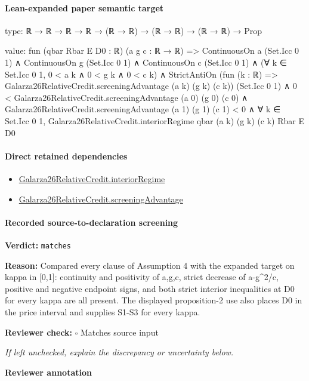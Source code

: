 \documentclass[10pt]{article}
\newcommand{\reviewerbox}{%
  \par\noindent\fbox{\parbox{0.96\linewidth}{\rule{0pt}{0.38in}}}\par
}
\newcommand{\reviewmatch}[1]{%
  \par\noindent\textbf{Reviewer check:} $\square$\; #1\par
  \noindent\emph{If left unchecked, explain the discrepancy or uncertainty below.}\par
}
\begin{document}
\paragraph{Lean-expanded paper semantic target}
\begin{ReviewVerbatim}
type:
ℝ → ℝ → ℝ → ℝ → (ℝ → ℝ) → (ℝ → ℝ) → (ℝ → ℝ) → Prop

value:
fun (qbar Rbar E D0 : ℝ) (a g c : ℝ → ℝ) =>
  ContinuousOn a (Set.Icc 0 1) ∧
    ContinuousOn g (Set.Icc 0 1) ∧
      ContinuousOn c (Set.Icc 0 1) ∧
        (∀ k ∈ Set.Icc 0 1, 0 < a k ∧ 0 < g k ∧ 0 < c k) ∧
          StrictAntiOn (fun (k : ℝ) => Galarza26RelativeCredit.screeningAdvantage (a k) (g k) (c k)) (Set.Icc 0 1) ∧
            0 < Galarza26RelativeCredit.screeningAdvantage (a 0) (g 0) (c 0) ∧
              Galarza26RelativeCredit.screeningAdvantage (a 1) (g 1) (c 1) < 0 ∧
                ∀ k ∈ Set.Icc 0 1, Galarza26RelativeCredit.interiorRegime qbar (a k) (g k) (c k) Rbar E D0
\end{ReviewVerbatim}

\paragraph{Direct retained dependencies}
\begin{itemize}\raggedright
\item \hyperlink{governing-declaration-5f246d7c1bbfcd61}{Galarza26\allowbreak{}Relative\allowbreak{}Credit.\allowbreak{}interior\allowbreak{}Regime}
\item \hyperlink{paper-prerequisite-29fcb63a4a0578b3}{Galarza26\allowbreak{}Relative\allowbreak{}Credit.\allowbreak{}screening\allowbreak{}Advantage}
\end{itemize}
\paragraph{Recorded source-to-declaration screening}
\textbf{Verdict:} \texttt{matches}
\\
{\raggedright
\textbf{Reason:} Compared every clause of Assumption 4 with the expanded target on kappa in [0,1]:\allowbreak{} continuity and positivity of a,g,c, strict decrease of a-\allowbreak{}g\textasciicircum{}2/\allowbreak{}c, positive and negative endpoint signs, and both strict interior inequalities at D0 for every kappa are all present.\allowbreak{} The displayed proposition-\allowbreak{}2 use also places D0 in the price interval and supplies S1-\allowbreak{}S3 for every kappa.\allowbreak{}
\par}
\reviewmatch{Matches source input}
\noindent\textbf{Reviewer annotation}\par
\reviewerbox
\clearpage
\hypertarget{paper-prerequisite-527f5e3e1ca86ece}{}
\end{document}
